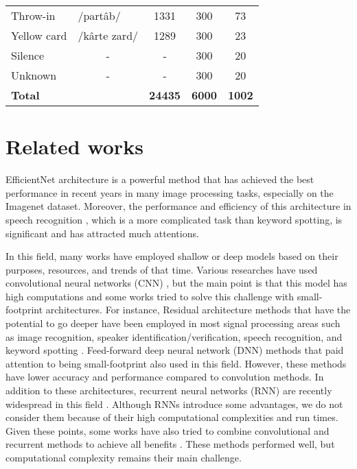 \documentclass{article}
\begin{document}
\begin{table}[h]
\begin{tabular}{llccc}
Throw-in               & /partâb/              & 1331          & 300         & 73         \\
Yellow card            & /kârte zard/          & 1289          & 300         & 23         \\
Silence                & \multicolumn{1}{c}{-} & -             & 300         & 20         \\
Unknown                & \multicolumn{1}{c}{-} & -             & 300         & 20         \\
\hline
\multicolumn{2}{l}{\textbf{Total}}  & \textbf{24435}         & \textbf{6000}        & \textbf{1002}\\
\hline
\end{tabular}
\end{table}
\section{Related works}
EfficientNet architecture is a powerful method that has achieved the best performance in recent years in many image processing tasks, especially on the Imagenet dataset. Moreover, the performance and efficiency of this architecture in speech recognition \cite{effspeech}, which is a more complicated task than keyword spotting, is significant and has attracted much attentions.

In this field, many works have employed shallow or deep models based on their purposes, resources, and trends of that time. Various researches have used convolutional neural networks (CNN) \cite{cnn2}\cite{cnn1}\cite{bbn}, but the main point is that this model has high computations and some works tried to solve this challenge with small-footprint architectures\cite{honk}\cite{cnnsmall}. For instance, Residual architecture methods that have the potential to go deeper have been employed in most signal processing areas such as image recognition, speaker identification/verification, speech recognition, and keyword spotting \cite{honk}. Feed-forward deep neural network (DNN) methods that paid attention to being small-footprint also used in this field\cite{DNN1}\cite{DNN2}\cite{DNN3}. However, these methods have lower accuracy and performance compared to convolution methods. In addition to these architectures, recurrent neural networks (RNN) are recently widespread in this field \cite{rnn2}. Although RNNs introduce some advantages, we do not consider them because of their high computational complexities and run times. Given these points, some works have also tried to combine convolutional and recurrent methods to achieve all benefits \cite{tfc}\cite{crnn}\cite{crnn2}. These methods performed well, but computational complexity remains their main challenge.
\end{document}
